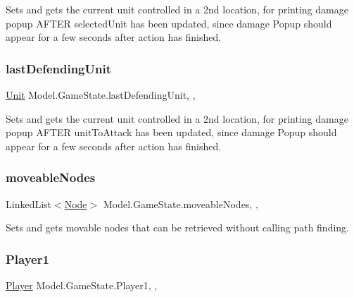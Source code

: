Sets and gets the current unit controlled in a 2nd location, for printing damage popup A\+F\+T\+ER selected\+Unit has been updated, since damage Popup should appear for a few seconds after action has finished. \hypertarget{class_model_1_1_game_state_a129d00c79e3a48b00089ef2d98605810}{}\label{class_model_1_1_game_state_a129d00c79e3a48b00089ef2d98605810} 
\subsubsection{\texorpdfstring{last\+Defending\+Unit}{lastDefendingUnit}}
{\footnotesize\ttfamily \hyperlink{interface_model_1_1_unit_module_1_1_unit}{Unit} Model.\+Game\+State.\+last\+Defending\+Unit\hspace{0.3cm}{\ttfamily [static]}, {\ttfamily [get]}, {\ttfamily [set]}}

Sets and gets the current unit controlled in a 2nd location, for printing damage popup A\+F\+T\+ER unit\+To\+Attack has been updated, since damage Popup should appear for a few seconds after action has finished. \hypertarget{class_model_1_1_game_state_aa2e325332a755c971d36c7c388d136d2}{}\label{class_model_1_1_game_state_aa2e325332a755c971d36c7c388d136d2} 
\subsubsection{\texorpdfstring{moveable\+Nodes}{moveableNodes}}
{\footnotesize\ttfamily Linked\+List$<$\hyperlink{class_model_1_1_map_module_1_1_node}{Node}$>$ Model.\+Game\+State.\+moveable\+Nodes\hspace{0.3cm}{\ttfamily [static]}, {\ttfamily [get]}, {\ttfamily [set]}}

Sets and gets movable nodes that can be retrieved without calling path finding. \hypertarget{class_model_1_1_game_state_a37fe1921acaf4d972606d49d2365105e}{}\label{class_model_1_1_game_state_a37fe1921acaf4d972606d49d2365105e} 
\subsubsection{\texorpdfstring{Player1}{Player1}}
{\footnotesize\ttfamily \hyperlink{class_model_1_1_player}{Player} Model.\+Game\+State.\+Player1\hspace{0.3cm}{\ttfamily [static]}, {\ttfamily [get]}, {\ttfamily [set]}}

